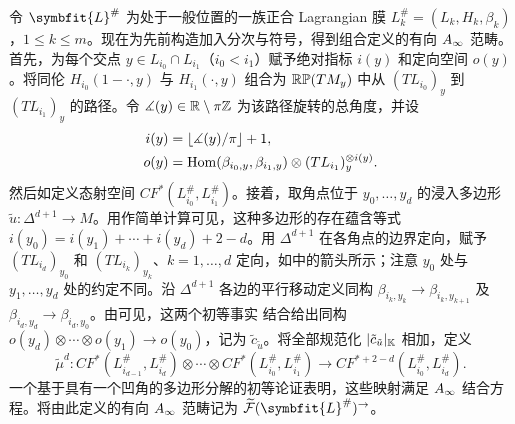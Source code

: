 令 $\symbfit{L}^\#$ 为处于一般位置的一族正合 Lagrangian 膜 $L_k^\#=(L_k,\allowbreak H_k,\allowbreak \beta_k)$，$1\leq k\leq m$。现在为先前构造加入分次与符号，得到组合定义的有向 $A_\infty$ 范畴。首先，为每个交点 $y\in L_{i_0}\cap L_{i_1}$（$i_0<i_1$）赋予绝对指标 $i(y)$ 和定向空间 $o(y)$。将同伦 $H_{i_0}(1-\cdot,\allowbreak y)$ 与 $H_{i_1}(\cdot,\allowbreak y)$ 组合为 $\mathbb{RP}(TM_y)$ 中从 $(TL_{i_0})_y$ 到 $(TL_{i_1})_y$ 的路径。令 $\measuredangle(y)\in\mathbb R\setminus\pi\mathbb Z$ 为该路径旋转的总角度，并设
\begin{equation}\label{eq:13.6}
\begin{aligned}
i(y)&=\lfloor\measuredangle(y)/\pi\rfloor+1,\\
o(y)&=\operatorname{Hom}(\beta_{i_0,y},\beta_{i_1,y})\otimes(TL_{i_1})_y^{\otimes i(y)}.
\end{aligned}
\end{equation}
然后如定义态射空间 $CF^*(L_{i_0}^\#,\allowbreak L_{i_1}^\#)$。接着，取角点位于 $y_0,\allowbreak \ldots,\allowbreak y_d$ 的浸入多边形 $\tilde u:\Delta^{d+1}\to M$。用作简单计算可见，这种多边形的存在蕴含等式 $i(y_0)=i(y_1)+\cdots+i(y_d)+2-d$。用 $\Delta^{d+1}$ 在各角点的边界定向，赋予 $(TL_{i_d})_{y_0}$ 和 $(TL_{i_k})_{y_k}$、$k=1,\allowbreak \ldots,\allowbreak d$ 定向，如中的箭头所示；注意 $y_0$ 处与 $y_1,\allowbreak \ldots,\allowbreak y_d$ 处的约定不同。沿 $\Delta^{d+1}$ 各边的平行移动定义同构 $\beta_{i_k,\allowbreak y_k}\to\beta_{i_k,\allowbreak y_{k+1}}$ 及 $\beta_{i_d,\allowbreak y_d}\to\beta_{i_d,\allowbreak y_0}$。由可见，这两个初等事实
结合给出同构 $o(y_d)\otimes\cdots\otimes o(y_1)\to o(y_0)$，记为 $\tilde c_{\tilde u}$。将全部规范化 $|\tilde c_{\tilde u}|_{\mathbb K}$ 相加，定义
\[
\tilde\mu^d:CF^*(L_{i_{d-1}}^\#,L_{i_d}^\#)\otimes\cdots\otimes CF^*(L_{i_0}^\#,L_{i_1}^\#)
\longrightarrow CF^{*+2-d}(L_{i_0}^\#,L_{i_d}^\#).
\]
一个基于具有一个凹角的多边形分解的初等论证表明，这些映射满足 $A_\infty$ 结合方程。将由此定义的有向 $A_\infty$ 范畴记为 $\widetilde{\F}(\symbfit{L}^\#)^\to$。

